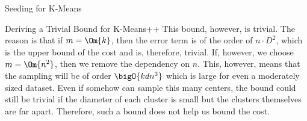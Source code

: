 \documentclass[10pt]{article}
\begin{document}
\begin{psection}{Seeding for K-Means}
\begin{psubsection}{Deriving a Trivial Bound for K-Means++}
        This bound, however, is trivial. The reason is that if $m = \Om{k}$, then
        the error term is of the order of $n \cdot D^2$, which is the upper bound of
        the cost and is, therefore, trivial. If, however, we choose $m = \Om{n^2}$,
        then we remove the dependency on $n$. This, however, means that the sampling
        will be of order $\bigO{kdn^3}$ which is large for even a moderately sized
        dataset. Even if somehow can sample this many centers, the bound could still
        be trivial if the diameter of each cluster is small but the clusters
        themselves are far apart. Therefore, such a bound does not help us bound the
        cost.

    \end{psubsection}

\end{psection}



\end{document}

